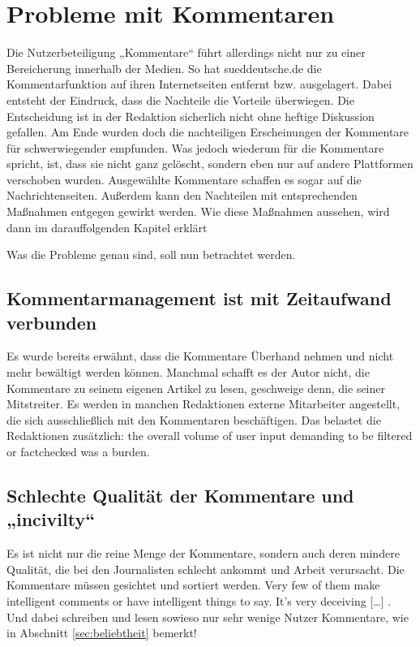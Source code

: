 \chapter{Probleme mit Kommentaren} \label{kap:probleme}

Die Nutzerbeteiligung „Kommentare“ führt allerdings nicht nur zu einer
Bereicherung innerhalb der Medien. So hat sueddeutsche.de die Kommentarfunktion
auf ihren Internetseiten entfernt bzw. ausgelagert. Dabei entsteht der Eindruck,
dass die Nachteile die Vorteile überwiegen. Die Entscheidung ist in der
Redaktion sicherlich nicht ohne heftige Diskussion gefallen. Am Ende wurden doch
die nachteiligen Erscheinungen der Kommentare für schwerwiegender empfunden. Was
jedoch wiederum für die Kommentare spricht, ist, dass sie nicht ganz gelöscht,
sondern eben nur auf andere Plattformen verschoben wurden. Ausgewählte
Kommentare schaffen es sogar auf die Nachrichtenseiten. Außerdem kann den
Nachteilen mit entsprechenden Maßnahmen entgegen gewirkt werden. Wie diese
Maßnahmen aussehen, wird dann im darauffolgenden Kapitel erklärt

Was die Probleme genau sind, soll nun betrachtet werden.

\section{Kommentarmanagement ist mit Zeitaufwand verbunden}

Es wurde bereits erwähnt, dass die Kommentare Überhand nehmen und nicht mehr
bewältigt werden können. Manchmal schafft es der Autor nicht, die Kommentare zu
seinem eigenen Artikel zu lesen, geschweige denn, die seiner Mitstreiter. Es
werden in manchen Redaktionen externe Mitarbeiter angestellt, die sich
ausschließlich mit den Kommentaren beschäftigen. Das belastet die Redaktionen
zusätzlich: \glqq[\ldots] the overall volume of user input demanding to be filtered
or factchecked was a burden.\grqq{} \autocite[S.~172]{quandt}


\section{Schlechte Qualität der Kommentare und „incivilty“} \label{sec:schlecht}

Es ist nicht nur die reine Menge der Kommentare, sondern auch deren mindere
Qualität, die bei den Journalisten schlecht ankommt und Arbeit verursacht. Die
Kommentare müssen gesichtet und sortiert werden. \glqq Very few of them make
intelligent comments or have intelligent things to say. It's very deceiving
[\ldots]\grqq\- \autocite[S.~ 103]{reich}. Und dabei schreiben und lesen sowieso nur
sehr wenige Nutzer Kommentare, wie in Abschnitt \ref{sec:beliebtheit}
bemerkt!

